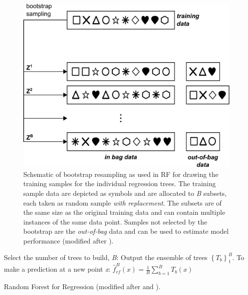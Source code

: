 \begin{figure}[tb]
	\centering
	\includegraphics[width=.8\textwidth]{Figures/bootstrap/bagging_RF_landscape} %
	\caption[Schematic of bootstrap resampling used in Random Forests.]
	{Schematic of bootstrap resampling as used in \ac{RF} for drawing the training samples for the individual regression trees.
		The training sample data are depicted as symbols and are allocated to \emph{B} subsets, each taken as random sample \emph{with replacement}.
		The subsets are of the same size as the original training data and can contain multiple instances of the same data point. Samples not selected by the
		bootstrap are the \emph{out-of-bag} data and can be used to estimate model performance (modified after \cite{Kuhn.2013b}).}
	\label{fig:bootstrap}
\end{figure}



\begin{algorithm}[bt]
	\SetAlCapFnt{\small\sffamily\bfseries}
	\SetAlCapNameFnt{\small}
	\small
	\DontPrintSemicolon
	
	Select the number of trees to build, \emph{B}:\;
	\BlankLine
	\BlankLine
	Output the ensemble of trees $\left\lbrace T_b\right\rbrace _1^B$.\;
	\BlankLine
	To make a prediction at a new point \emph{x}:\;
	$\hat{f}_{rf}^B(x)=\frac{1}{B}\sum_{b=1}^B T_b(x)$
	
	\caption{Random Forest for Regression (modified after \cite{Hastie.2009} and \cite{Kuhn.2013b}).}
	\label{algo:RF}		
\end{algorithm}


